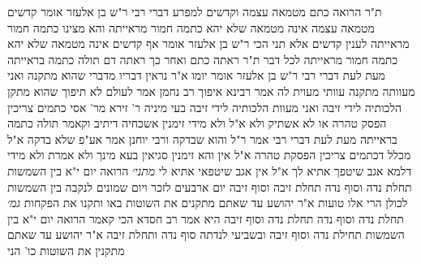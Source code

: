 \documentclass[12pt, openany]{book}
\begin{document}
{ת"ר  הרואה כתם מטמאה עצמה וקדשים למפרע דברי רבי 
ר"ש בן אלעזר אומר  קדשים מטמאה עצמה אינה מטמאה שלא יהא כתמה חמור מראייתה 
והא מצינו כתמה חמור מראייתה לענין קדשים 
אלא תני הכי  ר"ש בן אלעזר אומר אף קדשים אינה מטמאה שלא יהא כתמה חמור מראייתה לכל דבר 
ת"ר  ראתה כתם ואחר כך ראתה דם תולה כתמה בראייתה מעת לעת דברי רבי 
ר"ש בן אלעזר אומר  יומו  א"ר  נראין דבריו מדברי שהוא מתקנה ואני מעוותה 
מתקנה  עוותי מעוית לה  אמר רבינא  איפוך 
רב נחמן אמר  לעולם לא תיפוך שהוא מתקן הלכותיה לידי זיבה
ואני מעוות הלכותיה לידי זיבה 
בעי מיניה ר' זירא מר' אסי  כתמים צריכין הפסק טהרה או לא  אשתיק ולא א"ל ולא מידי 
זימנין אשכחיה דיתיב וקאמר  תולה כתמה בראייתה מעת לעת דברי רבי 
אמר ר"ל  והוא שבדקה ורבי יוחנן אמר  אע"פ שלא בדקה 
א"ל  מכלל דכתמים צריכין הפסקת טהרה  א"ל  אין  והא זימנין סגיאין בעא מינך ולא אמרת ולא מידי דלמא אגב שיטפך אתיא לך  א"ל  אין אגב שיטפאי אתיא לי
{\large\emph{מתני׳}} הרואה יום י"א בין השמשות תחלת נדה וסוף נדה תחלת זיבה וסוף זיבה 
יום ארבעים לזכר ויום שמונים לנקבה בין השמשות לכולן הרי אלו טועות
א"ר יהושע  עד שאתם מתקנים את השוטות באו ותקנו את הפקחות
{\large\emph{גמ׳}} תחלת נדה וסוף נדה תחלת נדה וסוף זיבה היא 
אמר רב חסדא הכי קאמר  הרואה יום י"א בין השמשות תחילת נדה וסוף זיבה
ובשביעי לנדתה סוף נדה ותחלת זיבה
א"ר יהושע עד שאתם מתקנין את השוטות כו' הני}
\end{document}
